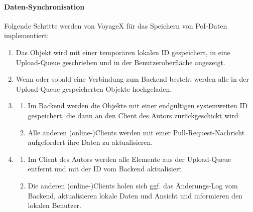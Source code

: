 \paragraph{Daten-Synchronisation}
Folgende Schritte werden von VoyageX für das Speichern von PoI-Daten implementiert: 
\begin{enumerate}[leftmargin=*,noitemsep,topsep=1ex,parsep=0pt,partopsep=0pt]
\item Das Objekt wird mit einer temporären lokalen ID gespeichert, in eine Upload-Queue geschrieben und in der Benutzeroberfläche angezeigt.
\item Wenn oder sobald eine Verbindung zum Backend besteht werden alle in der Upload-Queue gespeicherten Objekte hochgeladen.
\item 
\begin{enumerate}[label=\alph*),leftmargin=*,noitemsep,topsep=1ex,parsep=0pt,partopsep=0pt]
\item Im Backend werden die Objekte mit einer endgültigen systemweiten ID gespeichert, die dann
an den Client des Autors zurückgeschickt wird
\item Alle anderen (online-)Clients werden mit einer Pull-Request-Nachricht aufgefordert ihre Daten zu 		aktualisieren.
\end{enumerate}
\item
\begin{enumerate}[label=\alph*),leftmargin=*,noitemsep,topsep=1ex,parsep=0pt,partopsep=0pt]
\item Im Client des Autors werden alle Elemente aus der Upload-Queue entfernt und mit der ID vom Backend aktualisiert
\item Die anderen (online-)Clients holen sich ggf. das Änderungs-Log vom Backend, aktualisieren lokale Daten und Ansicht und informieren den lokalen Benutzer.
\end{enumerate}
\end{enumerate}
